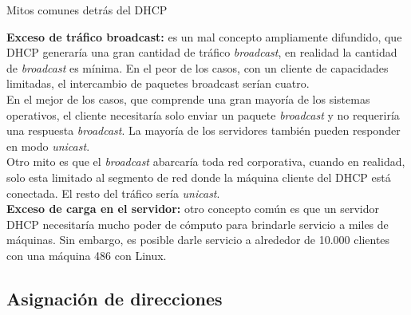 \begin{frame}{Mitos comunes detrás del DHCP} %

    \textbf{Exceso de tráfico broadcast:} es un mal concepto ampliamente
    difundido, que DHCP generaría una gran cantidad de tráfico \textit{broadcast},
    en realidad la cantidad de \textit{broadcast} es mínima. En el peor de los
    casos, con un cliente de capacidades limitadas, el intercambio de paquetes
    broadcast serían cuatro.\\[0.2cm]
    
    En el mejor de los casos, que comprende una gran mayoría de los sistemas
    operativos, el cliente necesitaría solo enviar un paquete \textit{broadcast}
    y no requeriría una respuesta \textit{broadcast}. La mayoría de los servidores
    también pueden responder en modo \textit{unicast}.\\[0.2cm]

    Otro mito es que el \textit{broadcast} abarcaría toda red corporativa,
    cuando en realidad, solo esta limitado al segmento de red donde la máquina
    cliente del DHCP está conectada. El resto del tráfico sería \textit{unicast}.\\[2cm]

    \textbf{Exceso de carga en el servidor:} otro concepto común es que un
    servidor DHCP necesitaría mucho poder de cómputo para brindarle servicio a
    miles de máquinas. Sin embargo, es posible darle servicio a alrededor de
    10.000 clientes con una máquina 486 con Linux.\\[0.2cm]

\end{frame} 

\subsection{Asignación de direcciones} %


